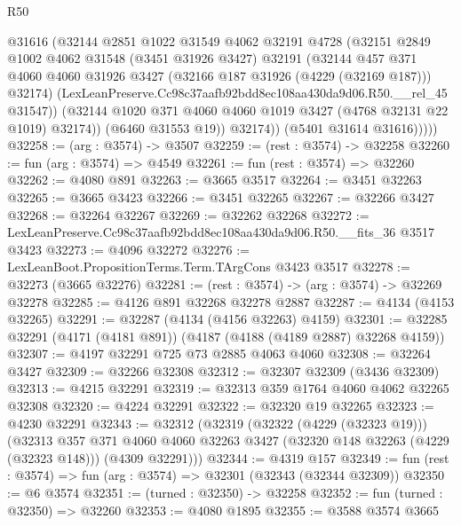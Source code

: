 \begin{lexlean}{R50}
\begin{coremodule}
                  @31616
                  (@32144
                    @2851
                    @1022
                    @31549
                    @4062
                    @32191
                    @4728
                    (@32151
                      @2849
                      @1002
                      @4062
                      @31548
                      (@3451 @31926 @3427)
                      @32191
                      (@32144
                        @457
                        @371
                        @4060
                        @4060
                        @31926
                        @3427
                        (@32166 @187 @31926 (@4229 (@32169 @187)))
                        @32174)
                      (LexLeanPreserve.Cc98c37aafb92bdd8ec108aa430da9d06.R50.__rel_45 @31547))
                    (@32144 @1020 @371 @4060 @4060 @1019 @3427 (@4768 @32131 @22 @1019) @32174))
                  (@6460 @31553 @19))
                @32174))
            (@5401 @31614 @31616)))))
@32258 := (arg : @3574) -> @3507
@32259 := (rest : @3574) -> @32258
@32260 := fun (arg : @3574) => @4549
@32261 := fun (rest : @3574) => @32260
@32262 := @4080 @891
@32263 := @3665 @3517
@32264 := @3451 @32263
@32265 := @3665 @3423
@32266 := @3451 @32265
@32267 := @32266 @3427
@32268 := @32264 @32267
@32269 := @32262 @32268
@32272 := LexLeanPreserve.Cc98c37aafb92bdd8ec108aa430da9d06.R50.__fits_36 @3517 @3423
@32273 := @4096 @32272
@32276 := LexLeanBoot.PropositionTerms.Term.TArgCons @3423 @3517
@32278 := @32273 (@3665 @32276)
@32281 := (rest : @3574) -> (arg : @3574) -> @32269 @32278
@32285 := @4126 @891 @32268 @32278 @2887
@32287 := @4134 (@4153 @32265)
@32291 := @32287 (@4134 (@4156 @32263) @4159)
@32301 := @32285 @32291 (@4171 (@4181 @891)) (@4187 (@4188 (@4189 @2887) @32268 @4159))
@32307 := @4197 @32291 @725 @73 @2885 @4063 @4060
@32308 := @32264 @3427
@32309 := @32266 @32308
@32312 := @32307 @32309 (@3436 @32309)
@32313 := @4215 @32291
@32319 := @32313 @359 @1764 @4060 @4062 @32265 @32308
@32320 := @4224 @32291
@32322 := @32320 @19 @32265
@32323 := @4230 @32291
@32343 := @32312
    (@32319
      (@32322 (@4229 (@32323 @19)))
      (@32313
        @357
        @371
        @4060
        @4060
        @32263
        @3427
        (@32320 @148 @32263 (@4229 (@32323 @148)))
        (@4309 @32291)))
@32344 := @4319 @157
@32349 := fun (rest : @3574) => fun (arg : @3574) => @32301 (@32343 (@32344 @32309))
@32350 := @6 @3574
@32351 := (turned : @32350) -> @32258
@32352 := fun (turned : @32350) => @32260
@32353 := @4080 @1895
@32355 := @3588 @3574 @3665

\end{coremodule}
\end{lexlean}
